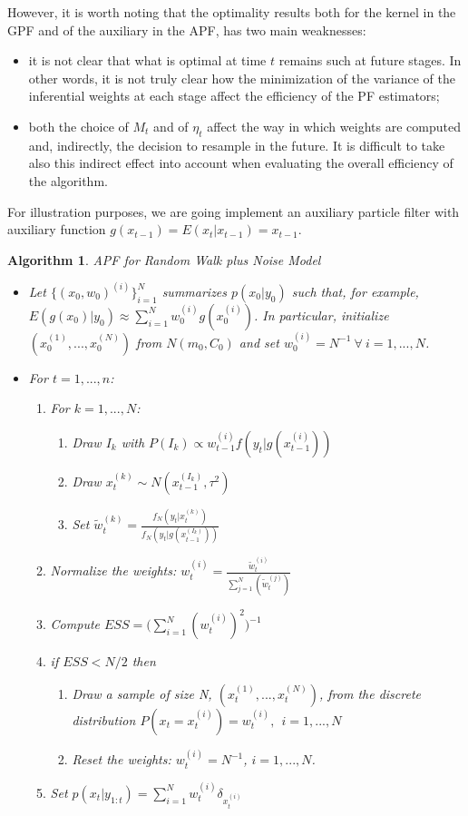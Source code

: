 \documentclass[
]{book}
\theoremstyle{break}
\theoremstyle{nonumberplain}
\newtheorem{algorithm}{Algorithm}[section]
\begin{document}
However, it is worth noting that the optimality results both for the
kernel in the GPF and of the auxiliary in the APF, has two main
weaknesses:

\begin{itemize}
    \item it is not clear that what is optimal at time $t$ remains such at future stages. In other words, it is not truly clear how the minimization of the variance of the inferential weights at each stage affect the efficiency of the PF estimators;
    \item both the choice of $M_t$ and of $\eta_t$ affect the way in which weights are computed and, indirectly, the decision to resample in the future. It is difficult to take also this indirect effect into account when evaluating the  overall efficiency of the algorithm.
\end{itemize}

For illustration purposes, we are going implement an auxiliary particle
filter with auxiliary function
\(g(x_{t-1})=E(x_{t}|x_{t-1})=x_{t-1}\).\\

\begin{algorithm} APF for Random Walk plus Noise Model
\begin{itemize}
\item Let $\{(x_{0},w_{0})^{(i)}\}_{i=1}^{N}$ summarizes $p(x_{0}|y_{0})$ such that, for example, $E(g(x_{0})|y_{0}) \approx \sum_{i=1}^{N}w_{0}^{(i)}g(x_{0}^{(i)})$. In particular, initialize $(x_{0}^{(1)},...,x_{0}^{(N)})$ from $N(m_{0},C_{0})$ and set $w_{0}^{(i)}=N^{-1} \ \forall \ i=1,...,N$.
\item For $t=1,...,n$:
\begin{enumerate}
\item For $k=1,...,N$:
\begin{enumerate}
\item Draw $I_{k}$ with $P(I_{k}) \propto w_{t-1}^{(i)}f(y_{t}|g(x_{t-1}^{(i)})) $
\item Draw $x_{t}^{(k)} \sim N(x_{t-1}^{(I_{k})},\tau^2)$
\item Set  $\tilde{w}_{t}^{(k)} = \frac{f_{N}(y_{t}|x_{t}^{(k)})}{f_{N}(y_{t}|g(x_{t-1}^{(I_{k})}))}$
\end{enumerate}
\item Normalize the weights: $w_{t}^{(i)}=\frac{\tilde{w}_{t}^{(i)}}{\sum_{j=1}^{N}(\tilde{w}_{t}^{(j)})}$
\item Compute $ESS=\Bigg(\sum_{i=1}^{N}(w_{t}^{(i)})^{2}\Bigg)^{-1}$
\item if $ESS<N/2$ then
\begin{enumerate}
\item Draw a sample of size N, $(x_{t}^{(1)},...,x_{t}^{(N)})$, from the discrete distribution $P(x_{t}=x_{t}^{(i)})=w_{t}^{(i)},\ \ i=1,...,N$
\item Reset the weights: $w_{t}^{(i)}=N^{-1}$, $i=1,...,N$.
\end{enumerate}
\item Set $p(x_{t}|y_{1:t})=\sum_{i=1}^{N}w_{t}^{(i)}\delta_{x_{t}^{(i)}}$
\end{enumerate}
\end{itemize}
\end{algorithm}
\end{document}
